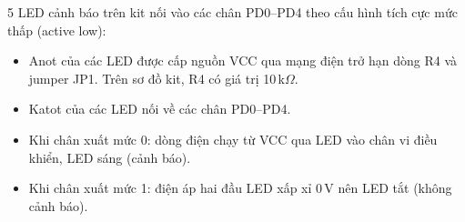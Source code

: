 5 LED cảnh báo trên kit nối vào các chân PD0--PD4 theo cấu hình tích cực mức thấp (active low):
\begin{itemize}[leftmargin=1.2cm]
    \item Anot của các LED được cấp nguồn VCC qua mạng điện trở hạn dòng R4 và jumper JP1. Trên sơ đồ kit, R4 có giá trị 10\,k$\Omega$.
    \item Katot của các LED nối về các chân PD0--PD4.
    \item Khi chân xuất mức 0: dòng điện chạy từ VCC qua LED vào chân vi điều khiển, LED sáng (cảnh báo).
    \item Khi chân xuất mức 1: điện áp hai đầu LED xấp xỉ 0\,V nên LED tắt (không cảnh báo).
\end{itemize}
